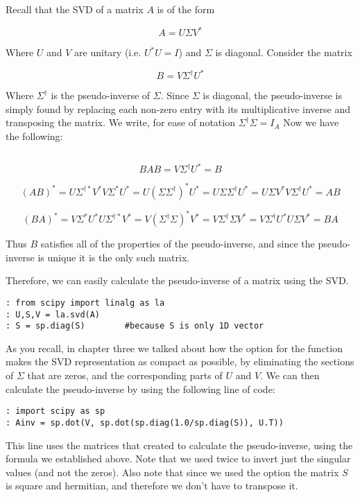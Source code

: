 Recall that the SVD of a matrix $A$ is of the form

\[
A = U \Sigma V^*
\]

Where $U$ and $V$ are unitary (i.e. $U^*U = I$) and $\Sigma$ is diagonal. Consider the matrix

\[
B = V \Sigma^\dagger U^*
\]

Where $\Sigma^\dagger$ is the pseudo-inverse of $\Sigma$. Since $\Sigma$ is diagonal, the pseudo-inverse is simply found by replacing each non-zero entry with its multiplicative inverse and transposing the matrix. We write, for ease of notation $\Sigma^\dagger \Sigma = I_A$ Now we have the following:

\[
                                                       \]

\[
BAB = V \Sigma^\dagger U^* = B
\]

\[
(AB)^* = U \Sigma^{\dagger *} V^* V \Sigma^* U^* = U (\Sigma \Sigma^\dagger)^* U^* = U \Sigma \Sigma^\dagger U^* = U \Sigma V^* V \Sigma^\dagger U^* = AB
\]

\[
(BA)^* =  V \Sigma^* U^* U \Sigma^{\dagger *} V^* = V (\Sigma^\dagger \Sigma)^* V^* = V  \Sigma^\dagger \Sigma V^* =  V \Sigma^\dagger U^* U \Sigma V^* = BA
\]

Thus $B$ satisfies all of the properties of the pseudo-inverse, and since the pseudo-inverse is unique it is the only such matrix.

Therefore, we can easily calculate the pseudo-inverse of a matrix using the SVD.

\begin{lstlisting}
: from scipy import linalg as la
: U,S,V = la.svd(A)
: S = sp.diag(S)        #because S is only 1D vector
\end{lstlisting}

As you recall, in chapter three we talked about how the  option for the  function makes the SVD representation as compact as possible, by eliminating the sections of $\Sigma$ that are zeros, and the corresponding parts of $U$ and $V$. We can then calculate the pseudo-inverse by using the following line of code:

\begin{lstlisting}
: import scipy as sp
: Ainv = sp.dot(V, sp.dot(sp.diag(1.0/sp.diag(S)), U.T))
\end{lstlisting}

This line uses the matrices that  created to calculate the pseudo-inverse, using the formula we established above. Note that we used  twice to invert just the singular values (and not the zeros). Also note that since we used the  option the matrix $S$ is square and hermitian, and therefore we don't have to transpose it.

